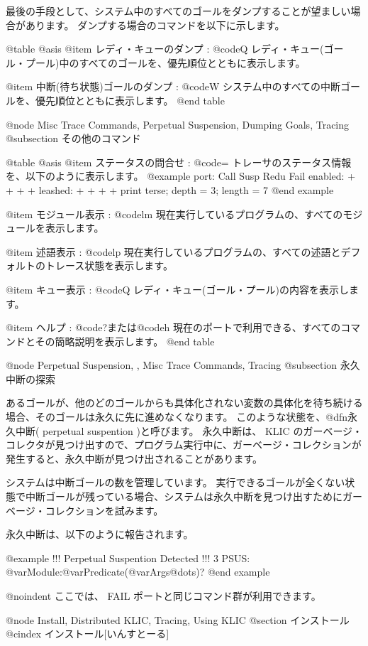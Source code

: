 {{{{最後の手段として、システム中のすべてのゴールをダンプすることが望ましい場合があります。
ダンプする場合のコマンドを以下に示します。

@table @asis
@item レディ・キューのダンプ : @code{Q}
レディ・キュー(ゴール・プール)中のすべてのゴールを、優先順位とともに表示します。

@item 中断(待ち状態)ゴールのダンプ : @code{W}
システム中のすべての中断ゴールを、優先順位とともに表示します。
@end table

@node Misc Trace Commands, Perpetual Suspension, Dumping Goals, Tracing
@subsection その他のコマンド

@table @asis
@item  ステータスの問合せ : @code{=}
トレーサのステータス情報を、以下のように表示します。
@example
   port: Call Susp Redu Fail
enabled:  +    +    +    +
leashed:  +    +    +    +
print terse; depth = 3; length = 7
@end example

@item モジュール表示 : @code{lm}
現在実行しているプログラムの、すべてのモジュールを表示します。

@item 述語表示 : @code{lp}
現在実行しているプログラムの、すべての述語とデフォルトのトレース状態を表示します。

@item キュー表示 : @code{Q}
レディ・キュー(ゴール・プール)の内容を表示します。

@item ヘルプ : @code{?}または@code{h}
現在のポートで利用できる、すべてのコマンドとその簡略説明を表示します。
@end table

@node Perpetual Suspension,  , Misc Trace Commands, Tracing
@subsection 永久中断の探索

あるゴールが、他のどのゴールからも具体化されない変数の具体化を待ち続ける場合、そのゴールは永久に先に進めなくなります。
このような状態を、@dfn{永久中断}( perpetual suspention )と呼びます。
永久中断は、 KLIC のガーベージ・コレクタが見つけ出すので、プログラム実行中に、ガーベージ・コレクションが発生すると、永久中断が見つけ出されることがあります。

システムは中断ゴールの数を管理しています。
実行できるゴールが全くない状態で中断ゴールが残っている場合、システムは永久中断を見つけ出すためにガーベージ・コレクションを試みます。

永久中断は、以下のように報告されます。

@example
!!! Perpetual Suspention Detected !!!
   3 PSUS: @var{Module}:@var{Predicate}(@var{Args}@dots{})? 
@end example

@noindent
ここでは、 FAIL ポートと同じコマンド群が利用できます。

@node Install, Distributed KLIC, Tracing, Using KLIC
@section インストール
@cindex インストール[いんすとーる]

}}}}
